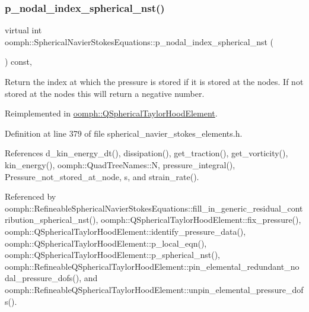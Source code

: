 \mbox{\label{classoomph_1_1SphericalNavierStokesEquations_a7b0edc8eedacaef9e55f3551a7cb5400}} 
\subsubsection{\texorpdfstring{p\+\_\+nodal\+\_\+index\+\_\+spherical\+\_\+nst()}{p\_nodal\_index\_spherical\_nst()}}
{\footnotesize\ttfamily virtual int oomph\+::\+Spherical\+Navier\+Stokes\+Equations\+::p\+\_\+nodal\+\_\+index\+\_\+spherical\+\_\+nst (\begin{DoxyParamCaption}{ }\end{DoxyParamCaption}) const\hspace{0.3cm}{\ttfamily [inline]}, {\ttfamily [virtual]}}



Return the index at which the pressure is stored if it is stored at the nodes. If not stored at the nodes this will return a negative number. 



Reimplemented in \hyperlink{classoomph_1_1QSphericalTaylorHoodElement_a8d7e127d0989233ad2bcd417536b54c0}{oomph\+::\+Q\+Spherical\+Taylor\+Hood\+Element}.



Definition at line 379 of file spherical\+\_\+navier\+\_\+stokes\+\_\+elements.\+h.



References d\+\_\+kin\+\_\+energy\+\_\+dt(), dissipation(), get\+\_\+traction(), get\+\_\+vorticity(), kin\+\_\+energy(), oomph\+::\+Quad\+Tree\+Names\+::N, pressure\+\_\+integral(), Pressure\+\_\+not\+\_\+stored\+\_\+at\+\_\+node, s, and strain\+\_\+rate().



Referenced by oomph\+::\+Refineable\+Spherical\+Navier\+Stokes\+Equations\+::fill\+\_\+in\+\_\+generic\+\_\+residual\+\_\+contribution\+\_\+spherical\+\_\+nst(), oomph\+::\+Q\+Spherical\+Taylor\+Hood\+Element\+::fix\+\_\+pressure(), oomph\+::\+Q\+Spherical\+Taylor\+Hood\+Element\+::identify\+\_\+pressure\+\_\+data(), oomph\+::\+Q\+Spherical\+Taylor\+Hood\+Element\+::p\+\_\+local\+\_\+eqn(), oomph\+::\+Q\+Spherical\+Taylor\+Hood\+Element\+::p\+\_\+spherical\+\_\+nst(), oomph\+::\+Refineable\+Q\+Spherical\+Taylor\+Hood\+Element\+::pin\+\_\+elemental\+\_\+redundant\+\_\+nodal\+\_\+pressure\+\_\+dofs(), and oomph\+::\+Refineable\+Q\+Spherical\+Taylor\+Hood\+Element\+::unpin\+\_\+elemental\+\_\+pressure\+\_\+dofs().

